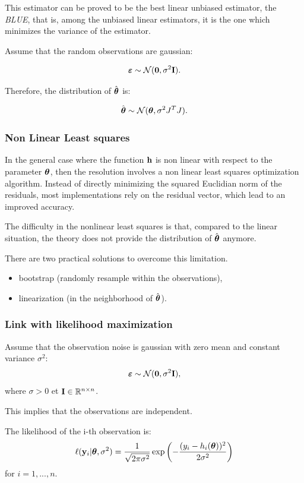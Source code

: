 \documentclass{beamer}
\begin{document}

\begin{frame}
This estimator can be proved to be the best linear unbiased estimator,
the \emph{BLUE}, that is, among the unbiased linear estimators, it is the one
which minimizes the variance of the estimator.

Assume that the random observations are gaussian:

$$
\boldsymbol{\varepsilon} \sim \mathcal{N}(\boldsymbol{0},\sigma^2 {\bf I}).
$$

Therefore, the distribution of $\hat{\boldsymbol{\theta}}$ is:

$$
\hat{\boldsymbol{\theta}} \sim \mathcal{N}(\boldsymbol{\theta},\sigma^2 J^T J).
$$


\end{frame}


\begin{frame}
\frametitle{Non Linear Least squares}

In the general case where the function ${\bf h}$ is non linear
with respect to the parameter $\boldsymbol{\theta}$, then the resolution
involves a non linear least squares optimization algorithm. Instead of
directly minimizing the squared Euclidian norm of the residuals, most
implementations rely on the residual vector, which lead to an improved
accuracy.

The difficulty in the nonlinear least squares is that, compared to the
linear situation, the theory does not provide the distribution of
$\hat{\boldsymbol{\theta}}$ anymore.

There are two practical solutions to overcome this limitation.
\begin{itemize}
\item bootstrap (randomly resample within the observations),
\item linearization (in the neighborhood of $\hat{\boldsymbol{\theta}}$).
\end{itemize}

\end{frame}


\begin{frame}
\frametitle{Link with likelihood maximization}
Assume that the observation noise is gaussian with zero mean and constant 
variance $\sigma^2$: 
$$
\boldsymbol{\varepsilon} \sim \mathcal{N}({\bf 0},\sigma^2 {\bf I}),
$$ 
where $\sigma>0$ et ${\bf I}\in\mathbb{R}^{n\times n}$. 

This implies that the observations are independent. 

The likelihood of the i-th observation is:
$$
\ell({\bf y}_i|\boldsymbol{\theta},\sigma^2) = 
\frac{1}{\sqrt{2\pi \sigma^2}} 
\exp\left(-\frac{(y_i - h_i(\boldsymbol{\theta}))^2}{2 \sigma^2}\right)
$$
for $i=1,...,n$. 
\end{frame}
\end{document}

